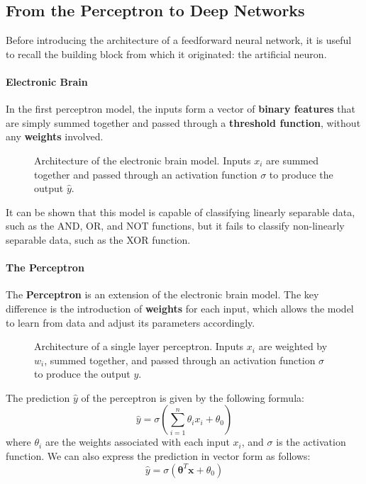 \subsection{From the Perceptron to Deep Networks}
Before introducing the architecture of a feedforward neural network, it is useful to recall the
building block from which it originated: the artificial neuron.

\paragraph{Electronic Brain}
In the first perceptron model, the inputs form a vector of \textbf{binary features} that are simply summed together and passed through a \textbf{threshold function},
without any \textbf{weights} involved.
\begin{figure}[H]
    \centering
    \scalebox{0.8}{
        
    }
    \caption{Architecture of the electronic brain model. Inputs $x_i$ are summed together and passed through an activation function $\sigma$ to produce the output $\hat{y}$.}
    \label{fig:electronic_brain}
\end{figure}
It can be shown that this model is capable of classifying linearly separable data, such as the AND, OR, and NOT functions, but it fails to classify non-linearly separable data, such as the XOR function.

\paragraph{The Perceptron}
The \textbf{Perceptron} is an extension of the electronic brain model.
The key difference is the introduction of \textbf{weights} for each input, which allows the model to learn from data and adjust its parameters accordingly.
\begin{figure}[H]
    \centering
    \scalebox{0.8}{
        
    }
    \caption{Architecture of a single layer perceptron. Inputs $x_i$ are weighted by $w_i$, summed together, and passed through an activation function $\sigma$ to produce the output $y$.}
    \label{fig:single_perceptron}
\end{figure}
The prediction $\hat{y}$ of the perceptron is given by the following formula:
\begin{equation}
    \hat{y} = \sigma\left(\sum_{i=1}^{n} \theta_i x_i + \theta_0\right)
\end{equation}
where $\theta_i$ are the weights associated with each input $x_i$, and $\sigma$ is the activation function.
We can also express the prediction in vector form as follows:
\begin{equation}
    \hat{y} = \sigma\left(\boldsymbol{\theta}^T \boldsymbol{x} + \theta_0\right)
\end{equation}

